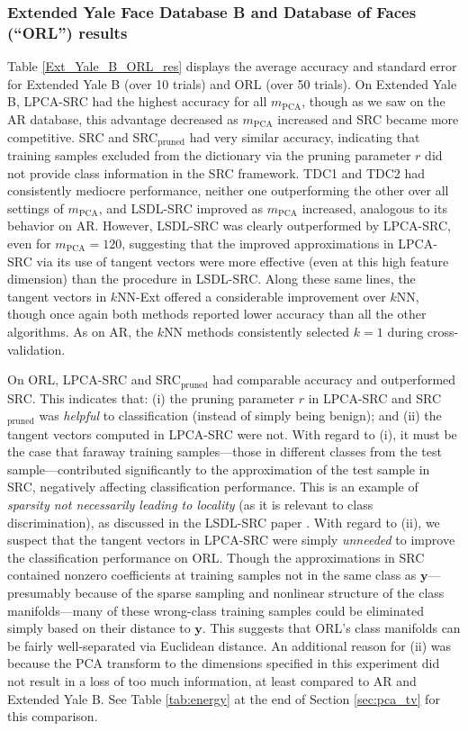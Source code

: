 \documentclass[review]{elsarticle}
\begin{document}
\subsubsection{Extended Yale Face Database B and Database of Faces (``ORL'') results} \label{sec:yale_orl}


Table \ref{Ext_Yale_B_ORL_res} displays the average accuracy and standard error for Extended Yale B (over 10 trials) and ORL (over 50 trials). On Extended Yale B, LPCA-SRC had the highest accuracy for all $m_\mathrm{PCA}$, though as we saw on the AR database, this advantage decreased as $m_\mathrm{PCA}$ increased and SRC became more competitive. SRC and SRC$_\mathrm{pruned}$ had very similar accuracy, indicating that training samples excluded from the dictionary via the pruning parameter $r$ did not provide class information in the SRC framework. TDC1 and TDC2 had consistently mediocre performance, neither one outperforming the other over all settings of $m_\mathrm{PCA}$, and LSDL-SRC improved as $m_\mathrm{PCA}$ increased, analogous to its behavior on AR. However, LSDL-SRC was clearly outperformed by LPCA-SRC, even for $m_\mathrm{PCA}=120$, suggesting that the improved approximations in LPCA-SRC via its use of tangent vectors were more effective (even at this high feature dimension) than the procedure in LSDL-SRC. Along these same lines, the tangent vectors in $k$NN-Ext offered a considerable improvement over $k$NN, though once again both methods reported lower accuracy than all the other algorithms. As on AR, the $k$NN methods consistently selected $k=1$ during cross-validation.


On ORL, LPCA-SRC and SRC$_\mathrm{pruned}$ had comparable accuracy and outperformed SRC. This indicates that: (i) the pruning parameter $r$ in LPCA-SRC and SRC$_\mathrm{pruned}$ was \emph{helpful} to classification (instead of simply being benign); and (ii) the tangent vectors computed in LPCA-SRC were not. With regard to (i), it must be the case that faraway training samples---those in different classes from the test sample---contributed significantly to the approximation of the test sample in SRC, negatively affecting classification performance. This is an example of \emph{sparsity not necessarily leading to locality} (as it is relevant to class discrimination), as discussed in the LSDL-SRC paper \cite{wei:lsdl}. With regard to (ii), we suspect that the tangent vectors in LPCA-SRC were simply \emph{unneeded} to improve the classification performance on ORL. Though the approximations in SRC contained nonzero coefficients at training samples not in the same class as $\bm{y}$---presumably because of the sparse sampling and nonlinear structure of the class manifolds---many of these wrong-class training samples could be eliminated simply based on their distance to $\bm{y}$. This suggests that ORL's class manifolds can be fairly well-separated via Euclidean distance. An additional reason for (ii) was because the PCA transform to the dimensions specified in this experiment did not result in a loss of too much information, at least compared to AR and Extended Yale B. See Table \ref{tab:energy} at the end of Section \ref{sec:pca_tv} for this comparison.
\end{document}
